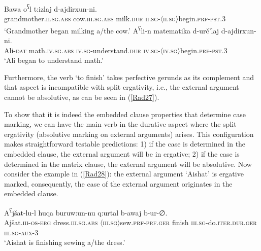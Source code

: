 \documentclass[output=paper]{langscibook}
\begin{document}
\ea\label{Rad24}
\gll Bawa o\textsuperscript{ʕ}l t:izlaj d-ajdirxun-ni.\\ 	
grandmother.\textsc{ii.sg.abs} cow.\textsc{iii.sg.abs} milk.\textsc{dur} \textsc{ii.sg-〈ii.sg〉}begin.\textsc{prf-pst.3}\\ 
\glt ‘Grandmother began milking a/the cow.’
\ex\label{Rad25}
\gll A\textsuperscript{ʕ}li-n matematika d-urč’laj	d-ajdirxun-ni.\\
Ali-\textsc{dat} math.\textsc{iv.sg.abs} \textsc{iv.sg}-understand.\textsc{dur} \textsc{iv.sg-〈iv.sg〉}begin.\textsc{prf-pst.3}\\
\glt ‘Ali began to understand math.’
\z 

Furthermore, the verb ‘to finish’ takes perfective gerunds as its complement and that aspect is incompatible with split ergativity, i.e., the external argument cannot be absolutive, as can be seen in (\ref{Rad27}). 
 
\ea\label{Rad27}
\z 
\z 

To show that it is indeed the embedded clause properties that determine case marking, we can have the main verb in the durative aspect where the split ergativity (absolutive marking on external arguments) arises. This configuration makes straightforward testable predictions: 1) if the case is determined in the embedded clause, the external argument will be in ergative; 2) if the case is determined in the matrix clause, the external argument will be absolutive. Now consider the example in (\ref{Rad28}): the external argument ‘Aishat’ is ergative marked, consequently, the case of the external argument originates in the embedded clause.

\ea\label{Rad28}
\gll A\textsuperscript{ʕ}jšat-lu-l huqa buruw:un-nu q:urtal b-awaj	b-ur-∅.\\
Ajšat.\textsc{iii-os-erg} dress.\textsc{iii.sg.abs} \textsc{〈iii.sg〉}sew.\textsc{prf-prf.ger} finish \textsc{iii.sg}-do.\textsc{iter.dur.ger} \textsc{iii.sg-aux-3}\\
\glt ‘Aishat is finishing sewing a/the dress.’
\z 
\end{document}
